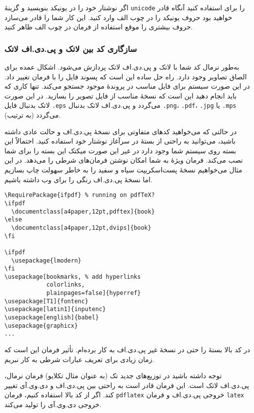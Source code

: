 اگر نوشتار‌ خود را در یونیکد بنویسید و گزینهٔ \verb+unicode+ را برای   استفاده کنید آنگاه قادر خواهید بود حروف یونیکد را در چوب الف وارد کنید. این کار شما را قادر می‌سازد حروف بیشتری را موقع استفاده از فرمان   در چوب الف ظاهر کنید.

\subsubsection{سازگاری کد بین لاتک و پی.دی.اف لاتک}
\label{sec:pdfcompat}

به‌طور نرمال کد شما با لاتک و پی.دی.اف لاتک پردازش می‌شود. اشکال عمده برای الصاق تصاویر وجود دارد. راه حل ساده این است که  پسوند فایل را با فرمان   تغییر داد. در این صورت سیستم برای فایل مناسب در پروندهٔ موجود جستجو می‌کند. تنها کاری که باید انجام دهید این است که نسخهٔ مناسب از فایل تصویر را بسازید. در این صورت لاتک بدنبال فایل  \texttt{.eps} می‌گردد و پی.دی.اف لاتک بدنبال 
\texttt{.png}، \texttt{.pdf}، \texttt{.jpg} یا \texttt{.mps} می‌گردد 
(به ترتیب).

در حالتی که می‌خواهید کدهای متفاوتی برای نسخهٔ پی.دی.اف و حالت عادی داشته باشید، می‌توانید به راحتی از بستهٔ %
     در سرآغاز نوشتار‌ خود استفاده کنید.
احتمالاً این بسته روی سیستم شما وجود دارد در غیر این صورت میکتک این بسته را برای شما نصب می‌کند. فرمان ویژهٔ   به شما امکان نوشتن فرمان‌های شرطی را می‌دهد. در این مثال می‌خواهیم نسخهٔ پست‌اسکریپت سیاه و سفید را به خاطر سهولت چاپ بسازیم اما نسخهٔ پی.دی.اف رنگی را برای وب داشته باشیم.
\begin{code}
\begin{verbatim}
\RequirePackage{ifpdf} % running on pdfTeX?
\ifpdf
  \documentclass[a4paper,12pt,pdftex]{book}
\else
  \documentclass[a4paper,12pt,dvips]{book}
\fi

\ifpdf
  \usepackage{lmodern}
\fi
\usepackage[bookmarks, % add hyperlinks
            colorlinks,
            plainpages=false]{hyperref}                    
\usepackage[T1]{fontenc}
\usepackage[latin1]{inputenc}
\usepackage[english]{babel}
\usepackage{graphicx}
...
\end{verbatim}
\end{code}
در کد بالا بستهٔ   را حتی در نسخهٔ غیر پی.دی.اف به کار برده‌ام. تأثیر فرمان   این است که زمان زیادی برای تعریف عبارات شرطی به کار نبریم.

توجه داشته باشید در توزیع‌های جدید تک 
(به عنوان مثال تکلایو)
فرمان نرمال، پی.دی.اف لاتک است. این فرمان قادر است به راحتی بین پی.دی.اف و دی.وی.آی تغییر کند. اگر از کد بالا استفاده کنیم، فرمان  \verb|pdflatex|
خروجی پی.دی.اف و فرمان  \verb|latex| خروجی دی.وی.آی را تولید می‌کند.

